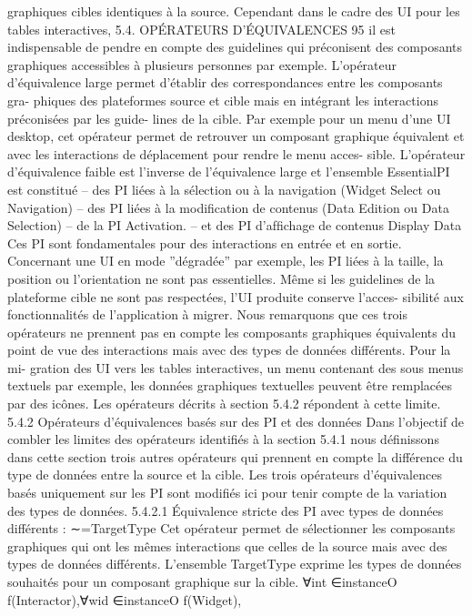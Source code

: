 \documentclass{article}
\begin{document}
graphiques cibles identiques à la source. Cependant dans le cadre des UI pour les tables interactives,
5.4. OPÉRATEURS D’ÉQUIVALENCES
95
il est indispensable de pendre en compte des guidelines qui préconisent des composants graphiques
accessibles à plusieurs personnes par exemple.
L’opérateur d’équivalence large permet d’établir des correspondances entre les composants gra-
phiques des plateformes source et cible mais en intégrant les interactions préconisées par les guide-
lines de la cible. Par exemple pour un menu d’une UI desktop, cet opérateur permet de retrouver un
composant graphique équivalent et avec les interactions de déplacement pour rendre le menu acces-
sible.
L’opérateur d’équivalence faible est l’inverse de l’équivalence large et l’ensemble EssentialPI est
constitué
– des PI liées à la sélection ou à la navigation (Widget Select ou Navigation)
– des PI liées à la modiﬁcation de contenus (Data Edition ou Data Selection)
– de la PI Activation.
– et des PI d’afﬁchage de contenus Display Data
Ces PI sont fondamentales pour des interactions en entrée et en sortie. Concernant une UI en mode
”dégradée” par exemple, les PI liées à la taille, la position ou l’orientation ne sont pas essentielles.
Même si les guidelines de la plateforme cible ne sont pas respectées, l’UI produite conserve l’acces-
sibilité aux fonctionnalités de l’application à migrer.
Nous remarquons que ces trois opérateurs ne prennent pas en compte les composants graphiques
équivalents du point de vue des interactions mais avec des types de données différents. Pour la mi-
gration des UI vers les tables interactives, un menu contenant des sous menus textuels par exemple,
les données graphiques textuelles peuvent être remplacées par des icônes. Les opérateurs décrits à
section 5.4.2 répondent à cette limite.
5.4.2
Opérateurs d’équivalences basés sur des PI et des données
Dans l’objectif de combler les limites des opérateurs identiﬁés à la section 5.4.1 nous déﬁnissons
dans cette section trois autres opérateurs qui prennent en compte la différence du type de données entre
la source et la cible. Les trois opérateurs d’équivalences basés uniquement sur les PI sont modiﬁés ici
pour tenir compte de la variation des types de données.
5.4.2.1
Équivalence stricte des PI avec types de données différents : ∼=TargetType
Cet opérateur permet de sélectionner les composants graphiques qui ont les mêmes interactions
que celles de la source mais avec des types de données différents. L’ensemble TargetType exprime
les types de données souhaités pour un composant graphique sur la cible.
∀int ∈instanceO f(Interactor),∀wid ∈instanceO f(Widget),
\end{document}
